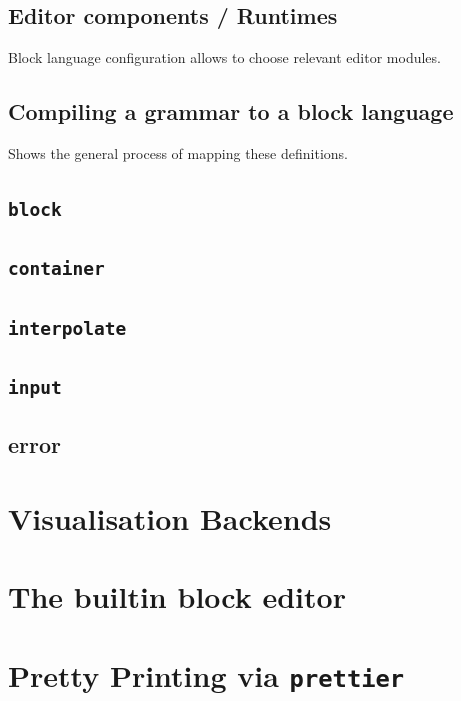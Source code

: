 \documentclass[]{report}
\begin{document}
\subsection{Editor components / Runtimes}

Block language configuration allows to choose relevant editor modules.

\subsection{Compiling a grammar to a block language}

Shows the general process of mapping these definitions.

\subsection{\texttt{block}}

\subsection{\texttt{container}}

\subsection{\texttt{interpolate}}

\subsection{\texttt{input}}

\subsection{error}

\section{Visualisation Backends}

\section{The builtin block editor}


\section{Pretty Printing via \texttt{prettier}}
\end{document}
